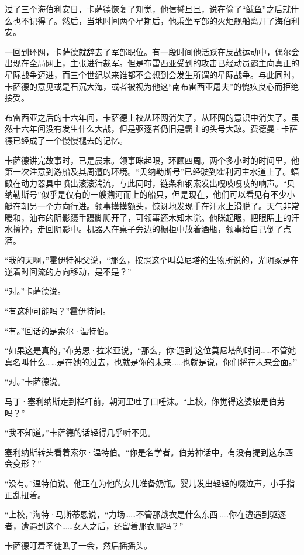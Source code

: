 \documentclass[AutoFakeBold=true]{book}
\begin{document}
过了三个海伯利安日，卡萨德恢复了知觉，他信誓旦旦，说在偷了``鱿鱼''之后就什么也不记得了。然后，当地时间两个星期后，他乘坐军部的火炬舰船离开了海伯利安。

一回到环网，卡萨德就辞去了军部职位。有一段时间他活跃在反战运动中，偶尔会出现在全局网上，主张进行裁军。但是布雷西亚受到的攻击已经动员霸主向真正的星际战争迈进，而三个世纪以来谁都不会想到会发生所谓的星际战争。与此同时，卡萨德的意见或是石沉大海，或者被视为他这``南布雷西亚屠夫''的愧疚良心而拒绝接受。

布雷西亚之后的十六年间，卡萨德上校从环网消失了，从环网的意识中消失了。虽然十六年间没有发生什么大战，但是驱逐者仍旧是霸主的头号大敌。费德曼·卡萨德已经成了一个慢慢褪去的记忆。

\vspace*{1em}

卡萨德讲完故事时，已是晨末。领事眯起眼，环顾四周。两个多小时的时间里，他第一次注意到游船及其周遭的环境。``贝纳勒斯号''已经驶到霍利河主水道上了。蝠鲼在动力器具中喷出滚滚湍流，与此同时，链条和钢索发出嘎吱嘎吱的响声。``贝纳勒斯号''似乎是仅有的一艘溯河而上的船只，但是现在，他们可以看见有不少小艇在朝另一个方向行进。领事摸摸额头，惊讶地发现手在汗水上滑脱了。天气非常暖和，油布的阴影蹑手蹑脚爬开了，可领事还木知木觉。他眯起眼，把眼睛上的汗水擦掉，走回阴影中。机器人在桌子旁边的橱柜中放着酒瓶，领事给自己倒了点酒。

``我的天啊，''霍伊特神父说，``那么，按照这个叫莫尼塔的生物所说的，光阴冢是在逆着时间流的方向移动，是不是？''

``对。''卡萨德说。

``有这种可能吗？''霍伊特问。

``有。''回话的是索尔·温特伯。

``如果这是真的，''布劳恩·拉米亚说，``那么，你`遇到'这位莫尼塔的时间……不管她真名叫什么……是在她的过去，也就是你的未来……也就是说，你们将在未来会面。''

``对。''卡萨德说。

马丁·塞利纳斯走到栏杆前，朝河里吐了口唾沫。``上校，你觉得这婆娘是伯劳吗？''

``我不知道。''卡萨德的话轻得几乎听不见。

塞利纳斯转头看着索尔·温特伯。``你是名学者。伯劳神话中，有没有提到这东西会变形？''

``没有。''温特伯说。他正在为他的女儿准备奶瓶。婴儿发出轻轻的啜泣声，小手指正乱扭着。

``上校，''海特·马斯蒂恩说，``力场……不管那战衣是什么东西……你在遭遇到驱逐者，遭遇到这个……女人之后，还留着那衣服吗？''

卡萨德盯着圣徒瞧了一会，然后摇摇头。
\end{document}
